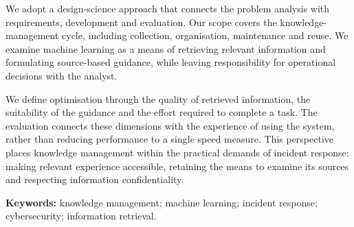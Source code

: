 We adopt a design-science approach that connects the problem analysis with requirements, development and evaluation. Our scope covers the knowledge-management cycle, including collection, organisation, maintenance and reuse. We examine machine learning as a means of retrieving relevant information and formulating source-based guidance, while leaving responsibility for operational decisions with the analyst.

We define optimisation through the quality of retrieved information, the suitability of the guidance and the effort required to complete a task. The evaluation connects these dimensions with the experience of using the system, rather than reducing performance to a single speed measure. This perspective places knowledge management within the practical demands of incident response: making relevant experience accessible, retaining the means to examine its sources and respecting information confidentiality.

\medskip
\noindent\textbf{Keywords:} knowledge management; machine learning; incident response; cybersecurity; information retrieval.
